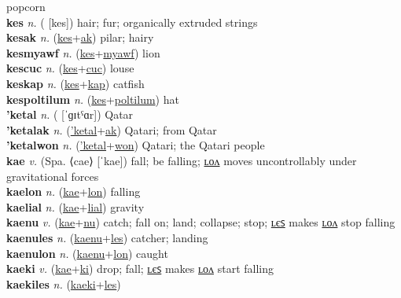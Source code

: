 popcorn \label{kehemais} \\
\textbf{kes} \textit{n.} ( [kes])
hair; fur; organically extruded strings \label{kes} \\
\textbf{kesak} \textit{n.} (\hyperref[kes]{kes}+\hyperref[ak]{ak})
pilar; hairy \label{kesak} \\
\textbf{kesmyawf} \textit{n.} (\hyperref[kes]{kes}+\hyperref[myawf]{myawf})
lion \label{kesmyawf} \\
\textbf{kescuc} \textit{n.} (\hyperref[kes]{kes}+\hyperref[cuc]{cuc})
louse \label{kescuc} \\
\textbf{keskap} \textit{n.} (\hyperref[kes]{kes}+\hyperref[kap]{kap})
catfish \label{keskap} \\
\textbf{kespoltilum} \textit{n.} (\hyperref[kes]{kes}+\hyperref[poltilum]{poltilum})
hat \label{kespoltilum} \\
\textbf{'ketal} \textit{n.} ( [ˈɡɪtˤɑr])
Qatar \label{'ketal} \\
\textbf{'ketalak} \textit{n.} (\hyperref['ketal]{'ketal}+\hyperref[ak]{ak})
Qatari; from Qatar \label{'ketalak} \\
\textbf{'ketalwon} \textit{n.} (\hyperref['ketal]{'ketal}+\hyperref[won]{won})
Qatari; the Qatari people \label{'ketalwon} \\
\textbf{kae} \textit{v.} (Spa. ⟨cae⟩ [ˈkae])
fall; be falling; \hyperref[kaelon]{ʟᴏᴧ} moves uncontrollably under gravitational forces \label{kae} \\
\textbf{kaelon} \textit{n.} (\hyperref[kae]{kae}+\hyperref[lon]{lon})
falling \label{kaelon} \\
\textbf{kaelial} \textit{n.} (\hyperref[kae]{kae}+\hyperref[lial]{lial})
gravity \label{kaelial} \\
\textbf{kaenu} \textit{v.} (\hyperref[kae]{kae}+\hyperref[nu]{nu})
catch; fall on; land; collapse; stop; \hyperref[kaenules]{ʟєꜱ} makes \hyperref[kaenulon]{ʟᴏᴧ} stop falling \label{kaenu} \\
\textbf{kaenules} \textit{n.} (\hyperref[kaenu]{kaenu}+\hyperref[les]{les})
catcher; landing \label{kaenules} \\
\textbf{kaenulon} \textit{n.} (\hyperref[kaenu]{kaenu}+\hyperref[lon]{lon})
caught \label{kaenulon} \\
\textbf{kaeki} \textit{v.} (\hyperref[kae]{kae}+\hyperref[ki]{ki})
drop; fall; \hyperref[kaekiles]{ʟєꜱ} makes \hyperref[kaekilon]{ʟᴏᴧ} start falling \label{kaeki} \\
\textbf{kaekiles} \textit{n.} (\hyperref[kaeki]{kaeki}+\hyperref[les]{les})
